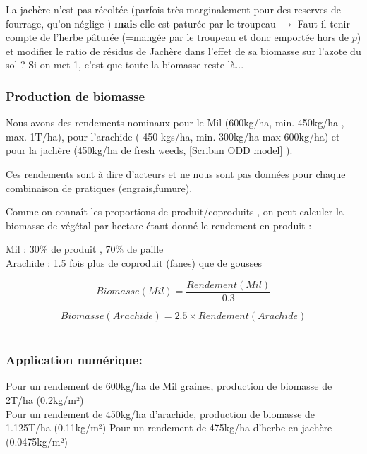 \documentclass[10pt,a4paper,french]{article} %
\begin{document}
\begin{tcolorbox}[noparskip,
    colback=LightGreen,colframe=DarkGreen,%
    colbacklower=LimeGreen!75!LightGreen,%
    title=Question]

La jachère n'est pas récoltée (parfois très marginalement pour des reserves de fourrage, qu'on néglige ) \textbf{mais} elle est paturée par le troupeau $\rightarrow$ Faut-il  tenir compte de l'herbe pâturée (=mangée par le troupeau et donc emportée hors de $p$) et modifier le ratio de résidus de Jachère dans l'effet de sa biomasse sur l'azote du sol ?  Si on met 1, c'est que toute la biomasse reste là...
\end{tcolorbox}




\subsubsection{Production de biomasse}


Nous avons des rendements nominaux pour le Mil (600kg/ha, min. 450kg/ha , max. 1T/ha), pour l'arachide ( 450 kgs/ha, min. 300kg/ha max 600kg/ha) et pour la jachère (450kg/ha de fresh weeds, [Scriban ODD model] ).

Ces rendements sont à dire d'acteurs et ne nous sont pas données pour chaque combinaison de pratiques (engrais,fumure).

Comme on connaît les proportions de  produit/coproduits , on peut calculer la biomasse de végétal par hectare étant donné le rendement en produit : 

Mil : 30\% de produit ,  70\% de paille \\
Arachide : 1.5 fois plus de coproduit (fanes) que de gousses

\begin{equation}
Biomasse(Mil) =  \frac{Rendement(Mil)}{0.3}
\end{equation}

\begin{equation}
Biomasse(Arachide) =  2.5 \times Rendement(Arachide)
\end{equation}\\


\subsubsection{Application numérique:} 

Pour un rendement de 600kg/ha de Mil graines, production de biomasse de 2T/ha (0.2kg/m²)\\
Pour un rendement de 450kg/ha d'arachide, production de biomasse de 1.125T/ha (0.11kg/m²)
Pour un rendement de 475kg/ha d'herbe en jachère (0.0475kg/m²) 
\end{document}
